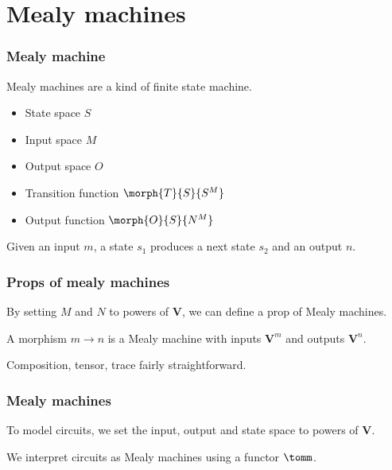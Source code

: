 \section{Mealy machines}

\begin{frame}
    \frametitle{}

    

\end{frame}

\begin{frame}
    \frametitle{Mealy machine}

    Mealy machines are a kind of \alert{finite state machine}.

    \pause
    \begin{itemize}
        \item \alert{State space} $S$ \pause
        \item \alert{Input space} $M$ \pause
        \item \alert{Output space} $O$ \pause
        \item \alert{Transition function} $\morph{T}{S}{S^M}$ \pause
        \item \alert{Output function} $\morph{O}{S}{N^M}$ \pause
    \end{itemize}

    Given an input $m$, a state $s_1$ produces a \alert{next state} $s_2$ and an \alert{output} $n$.

    \pause

    \begin{center}
        
    \end{center}

\end{frame}

\begin{frame}
    \frametitle{Props of mealy machines}

    By setting $M$ and $N$ to powers of $\textbf{V}$, we can define a prop of Mealy machines.

    \pause

    A morphism $m \to n$ is a Mealy machine with inputs $\textbf{V}^m$ and outputs $\textbf{V}^n$.
    
    \pause

    Composition, tensor, trace fairly straightforward.


\end{frame}

\begin{frame}
    \frametitle{Mealy machines}

    To model circuits, we set the input, output and state space to powers of $\textbf{V}$.

    \pause

    We interpret circuits as Mealy machines using a functor $\tomm$.

\end{frame}


